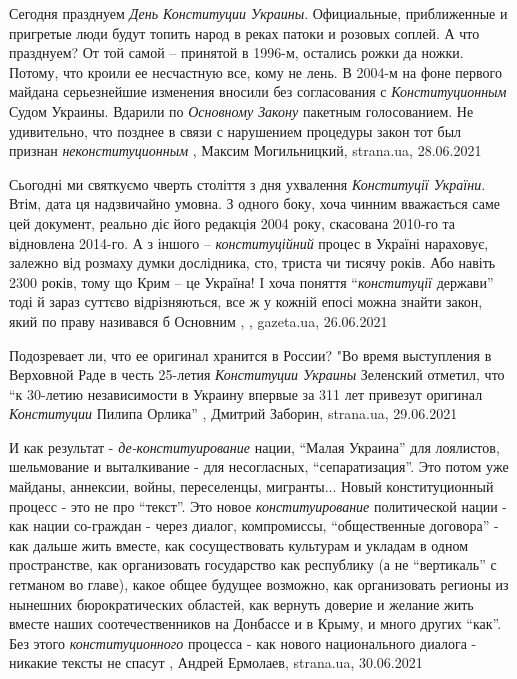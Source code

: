 Сегодня празднуем \emph{День Конституции Украины}. Официальные, приближенные и
пригретые люди будут топить народ в реках патоки и розовых соплей. А что
празднуем? От той самой – принятой в 1996-м, остались рожки да ножки. Потому,
что кроили ее несчастную все, кому не лень.  В 2004-м на фоне первого майдана
серьезнейшие изменения вносили без согласования с \emph{Конституционным} Судом
Украины. Вдарили по \emph{Основному Закону} пакетным голосованием. Не удивительно, что
позднее в связи с нарушением процедуры закон тот был признан \emph{неконституционным}
, 
Максим Могильницкий, strana.ua, 28.06.2021

Сьогодні ми святкуємо чверть століття з дня ухвалення \emph{Конституції України}.
Втім, дата ця надзвичайно умовна. З одного боку, хоча чинним вважається саме
цей документ, реально діє його редакція 2004 року, скасована 2010-го та
відновлена 2014-го. А з іншого – \emph{конституційний} процес в Україні нараховує,
залежно від розмаху думки дослідника, сто, триста чи тисячу років. Або навіть
2300 років, тому що Крим – це Україна! І хоча поняття \enquote{\emph{конституції} держави}
тоді й зараз суттєво відрізняються, все ж у кожній епосі можна знайти закон,
який по праву називався б Основним
, 
, gazeta.ua, 26.06.2021

Подозревает ли, что ее оригинал хранится в России?  "Во время выступления в
Верховной Раде в честь 25-летия \emph{Конституции Украины} Зеленский отметил, что \enquote{к
30-летию независимости в Украину впервые за 311 лет привезут оригинал
\emph{Конституции} Пилипа Орлика}
, 
Дмитрий Заборин, strana.ua, 29.06.2021

И как результат - \emph{де-конституирование} нации, \enquote{Малая Украина} для лоялистов,
шельмование и выталкивание - для несогласных, \enquote{сепаратизация}. Это потом уже
майданы, аннексии, войны, переселенцы, мигранты...  Новый конституционный
процесс - это не про \enquote{текст}. Это новое \emph{конституирование} политической нации -
как нации со-граждан - через диалог, компромиссы, \enquote{общественные договора} - как
дальше жить вместе, как сосуществовать культурам и укладам в одном
пространстве, как организовать государство как республику (а не \enquote{вертикаль} с
гетманом во главе), какое общее будущее возможно, как организовать регионы из
нынешних бюрократических областей, как вернуть доверие и желание жить вместе
наших соотечественников на Донбассе и в Крыму, и много других \enquote{как}. Без этого
\emph{конституционного} процесса - как нового национального диалога - никакие тексты
не спасут
, 
Андрей Ермолаев, strana.ua, 30.06.2021

